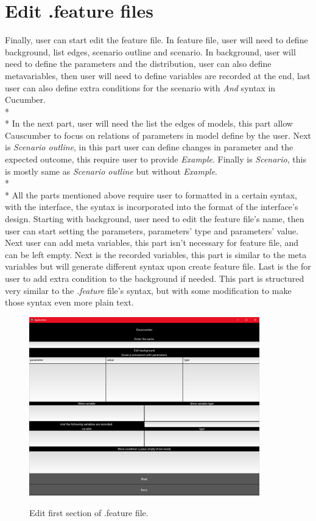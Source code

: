 \section{Edit .feature files}
Finally, user can start edit the feature file. In feature file, user will need to define background, list edges, scenario outline and scenario. In background, user will need to define the parameters and the distribution, user can also define metavariables, then user will need to define variables are recorded at the end, last user can also define extra conditions for the scenario with \textsl{And} syntax in Cucumber. \\*\\*
In the next part, user will need the list the edges of models, this part allow Causcumber to focus on relations of parameters in model define by the user. Next is \textsl{Scenario outline}, in this part user can define changes in parameter and the expected outcome, this require user to provide \textsl{Example}. Finally is \textsl{Scenario}, this is mostly same as \textsl{Scenario outline} but without  \textsl{Example}.\\*\\*
All the parts mentioned above require user to formatted in a certain syntax, with the interface, the syntax is incorporated into the format of the interface’s design. Starting with background, user need to edit the feature file’s name, then user can start setting the parameters, parameters’ type and parameters’ value. Next user can add meta variables, this part isn’t necessary for feature file, and can be left empty. Next is the recorded variables, this part is similar to the meta variables but will generate different syntax upon create feature file. Last is the for user to add extra condition to the background if needed. This part is structured very similar to the \textsl{.feature} file’s syntax, but with some modification to make those syntax even more plain text.
\begin{figure}[H]
	\centering
	\includegraphics[width=10cm]{figures/editFeature1Screen.png}\\
	\caption{Edit first section of .feature file.}
	\label{fig:figure16}
\end{figure}
